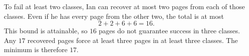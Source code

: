 To fail at least two classes, Ian can recover at most two pages from each of those classes. Even if he has every page from the other two, the total is at most
\[
2+2+6+6=16.
\]
This bound is attainable, so $16$ pages do not guarantee success in three classes. Any $17$ recovered pages force at least three pages in at least three classes. The minimum is therefore $\boxed{17}$.

